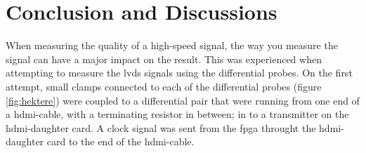 \documentclass[main.tex]{subfiles}
\begin{document}

\section{Conclusion and Discussions}

When measuring the quality of a high-speed signal, the way you measure the signal can have a major impact on the result. This was experienced when attempting to measure the \gls{lvds} signals using the differential probes. On the first attempt, small clamps connected to each of the differential probes (figure \ref{fig:hektere}) were coupled to a differential pair that were running from one end of a hdmi-cable, with a terminating resistor in between; in to a transmitter on the \gls{hdmi}-daughter card. A clock signal was sent from the \gls{fpga} throught the \gls{hdmi}-daughter card to the end of the hdmi-cable. 

\begin{figure}[H] 
   \begin{center}
   \end{center}
\end{figure}
\end{document}

